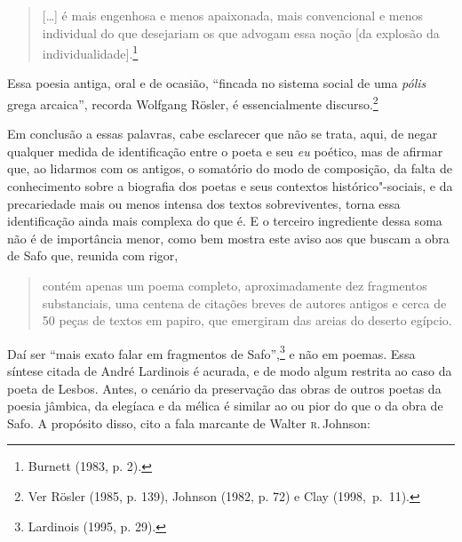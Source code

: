 \begin{quote}
[\ldots{}] é mais engenhosa e menos apaixonada,
mais convencional e menos individual do que desejariam os que advogam essa noção [da explosão da individualidade].\footnote{ Burnett (1983, p. 2).} 
\end{quote}

Essa poesia antiga, oral e de
ocasião, “fincada no sistema social de uma \textit{pólis} grega arcaica”,
recorda Wolfgang Rösler, é essencialmente discurso.\footnote{ Ver
Rösler (1985, p. 139), Johnson (1982, p. 72) e Clay \mbox{(1998, p. 11)}.}

Em conclusão a essas palavras, cabe esclarecer que não se trata, aqui, de negar
qualquer medida de identificação entre o poeta e seu \textit{eu} poético, mas de
afirmar que, ao lidarmos com os antigos, o somatório do modo de composição, da
falta de conhecimento sobre a biografia dos poetas e seus contextos
histórico"-sociais, e da precariedade mais ou menos intensa dos textos
sobreviventes, torna essa identificação ainda mais complexa do que é.
E o terceiro ingrediente dessa soma não é de importância menor, como
bem mostra este aviso aos que buscam a obra de Safo que, reunida com rigor,

\begin{quote}
contém apenas um poema completo, aproximadamente dez fragmentos substanciais,
uma centena de citações breves de autores antigos e cerca de 50 peças de textos
em papiro, que emergiram das areias do deserto egípcio.
\end{quote}

Daí ser “mais exato
falar em fragmentos de Safo”,\footnote{ Lardinois (1995, p. 29).} e não em
poemas. Essa síntese citada de André Lardinois é acurada, e de modo algum restrita ao
caso da poeta de Lesbos.
Antes, o cenário da preservação das obras de outros poetas da poesia jâmbica, da elegíaca e da mélica é similar ao ou pior do que
o da obra de Safo. A propósito disso, cito a fala marcante de Walter \textsc{r}.\,Johnson:

